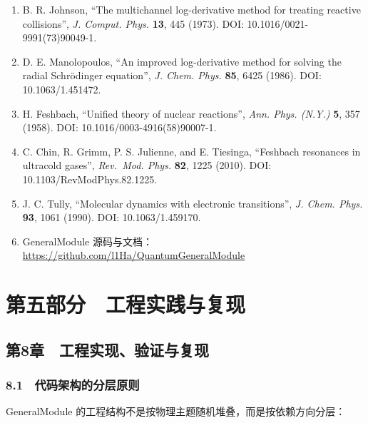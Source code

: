 \documentclass[
]{ctexbook}
\providecommand{\tightlist}{%
  \setlength{\itemsep}{0pt}\setlength{\parskip}{0pt}}
\let\origsection\section
\renewcommand{\section}[1]{%
  \needspace{9\baselineskip}%
  \origsection{#1}%
}
\let\origsubsection\subsection
\renewcommand{\subsection}[1]{%
  \needspace{6\baselineskip}%
  \origsubsection{#1}%
}
\begin{document}
\begin{enumerate}
\def\labelenumi{\arabic{enumi}.}
\tightlist
\item
  B. R. Johnson, ``The multichannel log-derivative method for treating
  reactive collisions'', \emph{J. Comput. Phys.} \textbf{13}, 445
  (1973). DOI: 10.1016/0021-9991(73)90049-1.
\item
  D. E. Manolopoulos, ``An improved log-derivative method for solving
  the radial Schrödinger equation'', \emph{J. Chem. Phys.} \textbf{85},
  6425 (1986). DOI: 10.1063/1.451472.
\item
  H. Feshbach, ``Unified theory of nuclear reactions'', \emph{Ann. Phys.
  (N.Y.)} \textbf{5}, 357 (1958). DOI: 10.1016/0003-4916(58)90007-1.
\item
  C. Chin, R. Grimm, P. S. Julienne, and E. Tiesinga, ``Feshbach
  resonances in ultracold gases'', \emph{Rev.~Mod. Phys.} \textbf{82},
  1225 (2010). DOI: 10.1103/RevModPhys.82.1225.
\item
  J. C. Tully, ``Molecular dynamics with electronic transitions'',
  \emph{J. Chem. Phys.} \textbf{93}, 1061 (1990). DOI: 10.1063/1.459170.
\item
  GeneralModule
  源码与文档：\url{https://github.com/l1Ha/QuantumGeneralModule}
\end{enumerate}

\hypertarget{ux7b2cux4e94ux90e8ux5206-ux5de5ux7a0bux5b9eux8df5ux4e0eux590dux73b0}{%
\section{第五部分　工程实践与复现}\label{ux7b2cux4e94ux90e8ux5206-ux5de5ux7a0bux5b9eux8df5ux4e0eux590dux73b0}}

\hypertarget{ux7b2c8ux7ae0-ux5de5ux7a0bux5b9eux73b0ux9a8cux8bc1ux4e0eux590dux73b0}{%
\subsection{第8章　工程实现、验证与复现}\label{ux7b2c8ux7ae0-ux5de5ux7a0bux5b9eux73b0ux9a8cux8bc1ux4e0eux590dux73b0}}

\hypertarget{ux4ee3ux7801ux67b6ux6784ux7684ux5206ux5c42ux539fux5219}{%
\subsubsection{8.1　代码架构的分层原则}\label{ux4ee3ux7801ux67b6ux6784ux7684ux5206ux5c42ux539fux5219}}

GeneralModule 的工程结构不是按物理主题随机堆叠，而是按依赖方向分层：
\end{document}
